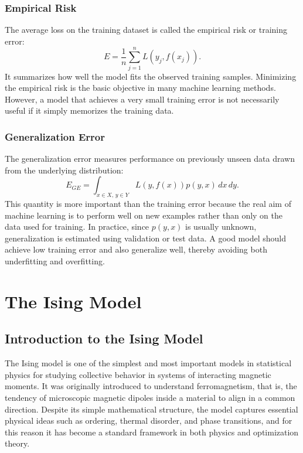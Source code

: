 \documentclass[english,12pt,a4paper]{report}
\begin{document}
\subsection{Empirical Risk}
The average loss on the training dataset is called the empirical risk or training error:
\[
E=\frac{1}{n}\sum_{j=1}^{n}L(y_j,f(x_j)).
\]
It summarizes how well the model fits the observed training samples. Minimizing the empirical risk is the basic objective in many machine learning methods. However, a model that achieves a very small training error is not necessarily useful if it simply memorizes the training data.

\subsection{Generalization Error}
The generalization error measures performance on previously unseen data drawn from the underlying distribution:
\[
E_{GE}=\int_{x\in X,\,y\in Y}L(y,f(x))p(y,x)\,dx\,dy.
\]
This quantity is more important than the training error because the real aim of machine learning is to perform well on new examples rather than only on the data used for training. In practice, since $p(y,x)$ is usually unknown, generalization is estimated using validation or test data. A good model should achieve low training error and also generalize well, thereby avoiding both underfitting and overfitting.

\chapter{The Ising Model}
\section{Introduction to the Ising Model}
The Ising model is one of the simplest and most important models in statistical physics for studying collective behavior in systems of interacting magnetic moments. It was originally introduced to understand ferromagnetism, that is, the tendency of microscopic magnetic dipoles inside a material to align in a common direction. Despite its simple mathematical structure, the model captures essential physical ideas such as ordering, thermal disorder, and phase transitions, and for this reason it has become a standard framework in both physics and optimization theory.
\end{document}
